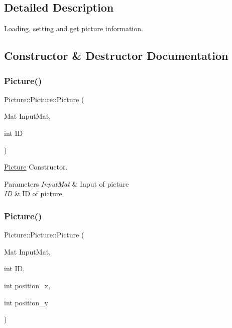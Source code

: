\subsection{Detailed Description}
Loading, setting and get picture information. 

\subsection{Constructor \& Destructor Documentation}
\mbox{\label{class_picture_1_1_picture_a165669e49c6744c9530e376ccc21bc09}} 
\subsubsection{\texorpdfstring{Picture()}{Picture()}\hspace{0.1cm}{\footnotesize\ttfamily [1/3]}}
{\footnotesize\ttfamily Picture\+::\+Picture\+::\+Picture (\begin{DoxyParamCaption}\item[{Mat}]{Input\+Mat,  }\item[{int}]{ID }\end{DoxyParamCaption})\hspace{0.3cm}{\ttfamily [inline]}}



\hyperlink{class_picture_1_1_picture}{Picture} Constructor. 


\begin{DoxyParams}{Parameters}
{\em Input\+Mat} & Input of picture \\
\hline
{\em ID} & ID of picture \\
\hline
\end{DoxyParams}
\mbox{\label{class_picture_1_1_picture_aa44b84f379d837a26bd23ba8ef7c59a6}} 
\subsubsection{\texorpdfstring{Picture()}{Picture()}\hspace{0.1cm}{\footnotesize\ttfamily [2/3]}}
{\footnotesize\ttfamily Picture\+::\+Picture\+::\+Picture (\begin{DoxyParamCaption}\item[{Mat}]{Input\+Mat,  }\item[{int}]{ID,  }\item[{int}]{position\+\_\+x,  }\item[{int}]{position\+\_\+y }\end{DoxyParamCaption})\hspace{0.3cm}{\ttfamily [inline]}}



